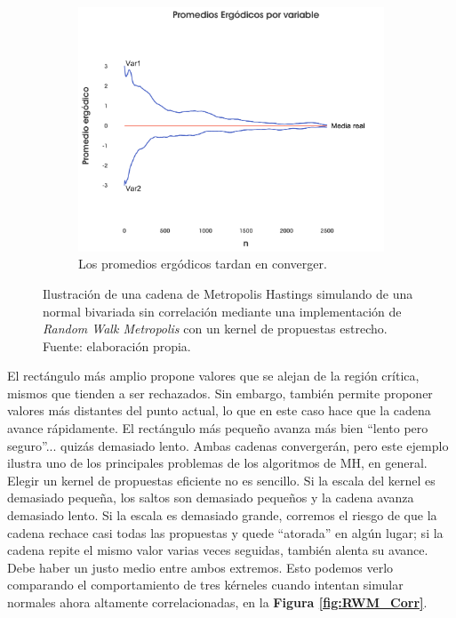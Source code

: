 \begin{figure}[h]
\begin{subfigure}{0.3\textwidth}
    \end{subfigure}
    ~
    \begin{subfigure}{0.3\textwidth}
        \includegraphics[width=\textwidth]{Figs/Bayes/Ejemplo2_RWM_C}
        \caption{Los promedios ergódicos tardan en converger.}
    \end{subfigure}
    \caption{Ilustración de una cadena de Metropolis Hastings simulando de una normal bivariada sin correlación mediante una implementación de \textit{Random Walk Metropolis} con un kernel de propuestas estrecho. Fuente: elaboración propia.}\label{fig:RWM2}
\end{figure}

El rectángulo más amplio propone valores que se alejan de la región crítica, mismos que tienden a ser rechazados. Sin embargo, también permite proponer valores más distantes del punto actual, lo que en este caso hace que la cadena avance rápidamente. El rectángulo más pequeño avanza más bien ``lento pero seguro''... quizás demasiado lento. Ambas cadenas convergerán, pero este ejemplo ilustra uno de los principales problemas de los algoritmos de MH, en general.\\ 

Elegir un kernel de propuestas eficiente no es sencillo. Si la escala del kernel es demasiado pequeña, los saltos son demasiado pequeños y la cadena avanza demasiado lento. Si la escala es demasiado grande, corremos el riesgo de que la cadena rechace casi todas las propuestas y quede ``atorada'' en algún lugar; si la cadena repite el mismo valor varias veces seguidas, también alenta su avance. Debe haber un justo medio entre ambos extremos. Esto podemos verlo comparando el comportamiento de tres kérneles cuando intentan simular normales ahora altamente correlacionadas, en la \textbf{Figura \ref{fig:RWM_Corr}}.\\ 

